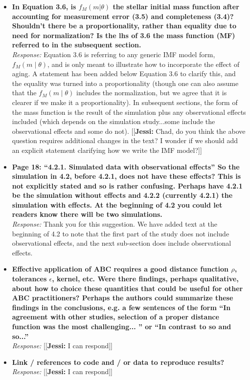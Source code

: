 \documentclass[11pt, oneside]{article}   	%
\newcommand{\jessi}[1]{{\color{blue}[[\textbf{Jessi: }#1]]}}
\begin{document}
\begin{itemize}
\item {\bf In Equation 3.6, is $f_M (m|\theta)$ the stellar initial mass function after accounting for measurement error (3.5) and completeness (3.4)? Shouldn't there be a proportionality, rather than equality due to need for normalization? Is the lhs of 3.6 the mass function (MF) referred to in the subsequent section.} \\
\noindent \emph{Response:}  Equation 3.6 is referring to any generic IMF model form, $f_M(m \mid \theta)$, and is only meant to illustrate how to incorporate the effect of aging.  A statement has been added below Equation 3.6 to clarify this, and the equality was turned into a proportionality (though one can also assume that the $f_M(m \mid \theta)$ includes the normalization, but we agree that it is clearer if we make it a proportionality).  In subsequent sections, the form of the mass function is the result of the simulation plus any observational effects included (which depends on the simulation study...some include the observational effects and some do not).  
\jessi{Chad, do you think the above question requires additional changes in the text?  I wonder if we should add an explicit statement clarifying how we write the IMF model?}
\bigskip

\item {\bf Page 18: ``4.2.1. Simulated data with observational effects'' So the simulation in 4.2, before 4.2.1, does not have these effects? This is not explicitly stated and so is rather confusing. Perhaps have 4.2.1 be the simulation without effects and 4.2.2 (currently 4.2.1) the simulation with effects. At the beginning of 4.2 you could let readers know there will be two simulations. }\\
\noindent \emph{Response:} Thank you for this suggestion.  We have added text at the beginning of 4.2 to note that the first part of the study  does not include observational effects, and the next sub-section does include observational effects.
\bigskip

\item {\bf Effective application of ABC requires a good distance function $\rho$, tolerances $\epsilon$, kernel, etc. Were there findings, perhaps qualitative, about how to choice these quantities that could be useful for other ABC practitioners? Perhaps the authors could summarize these findings in the conclusions, e.g. a few sentences of the form ``In agreement with other studies, selection of a proper distance function was the most challenging... '' or ``In contrast to so and so...'' }\\
\noindent \emph{Response:} \jessi{I can respond}
\bigskip

\item {\bf Link / references to code and / or data to reproduce results?} \\
\noindent \emph{Response:} \jessi{I can respond}
\bigskip
\end{itemize}
\end{document}
